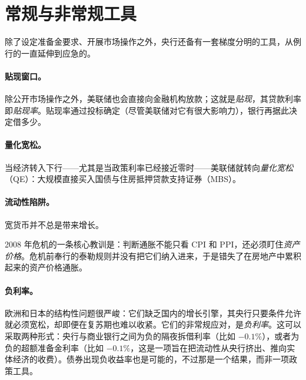 \section{常规与非常规工具}

除了设定准备金要求、开展市场操作之外，央行还备有一套梯度分明的工具，从例行的一直延伸到应急的。

\paragraph{贴现窗口。}除公开市场操作之外，美联储也会直接向金融机构放款；这就是\emph{贴现}，其贷款利率即\emph{贴现率}。贴现率通过投标确定（尽管美联储对它有很大影响力），银行再据此决定借多少。

\paragraph{量化宽松。}当经济转入下行——尤其是当政策利率已经接近零时——美联储就转向\emph{量化宽松}（QE）：大规模直接买入国债与住房抵押贷款支持证券（MBS）。


\paragraph{流动性陷阱。}宽货币并不总是带来增长。


\begin{remark}
2008 年危机的一条核心教训是：判断通胀不能只看 CPI 和 PPI，还必须盯住\emph{资产价格}。危机前奉行的泰勒规则并没有把它们纳入进来，于是错失了在房地产中累积起来的资产价格通胀。
\end{remark}

\paragraph{负利率。}欧洲和日本的结构性问题很严峻：它们缺乏国内的增长引擎，其央行只要条件允许就必须宽松，却即便在复苏期也难以收紧。它们的非常规应对，是\emph{负利率}。这可以采取两种形式：央行与商业银行之间为负的隔夜拆借利率（比如 $-0.1\%$），或者为负的超额准备金利率（比如 $-0.1\%$，这是一项旨在把流动性从央行挤出、推向实体经济的收费）。债券出现负收益率也是可能的，不过那是一个结果，而非一项政策工具。

